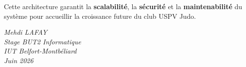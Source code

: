 \documentclass[11pt,a4paper]{article}
\begin{document}
Cette architecture garantit la \textbf{scalabilité}, la \textbf{sécurité} et la \textbf{maintenabilité} du système pour accueillir la croissance future du club USPV Judo.

\vspace{2cm}

\begin{flushright}
  \textit{Mehdi LAFAY}\\
  \textit{Stage BUT2 Informatique}\\
  \textit{IUT Belfort-Montbéliard}\\
  \textit{Juin 2026}
\end{flushright}
\end{document}
